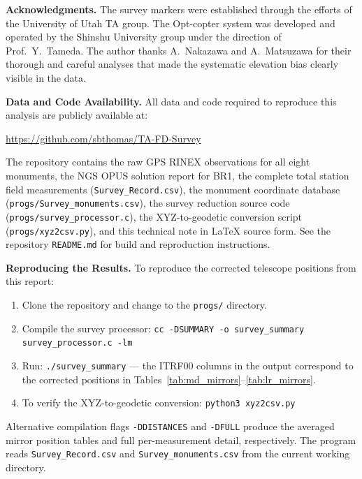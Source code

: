 \documentclass[11pt,letterpaper]{article}
\begin{document}
{\small
\noindent\textbf{Acknowledgments.} The survey markers were established through the efforts of the University of Utah TA group. The Opt-copter system was developed and operated by the Shinshu University group under the direction of Prof.\ Y.\ Tameda. The author thanks A.\ Nakazawa and A.\ Matsuzawa for their thorough and careful analyses that made the systematic elevation bias clearly visible in the data.

\vspace{0.5cm}

\noindent\textbf{Data and Code Availability.} All data and code required to reproduce this analysis are publicly available at:

\begin{center}
\url{https://github.com/sbthomas/TA-FD-Survey}
\end{center}

\noindent The repository contains the raw GPS RINEX observations for all eight monuments, the NGS OPUS solution report for BR1, the complete total station field measurements (\texttt{Survey\_Record.csv}), the monument coordinate database (\texttt{progs/Survey\_monuments.csv}), the survey reduction source code (\texttt{progs/survey\_processor.c}), the XYZ-to-geodetic conversion script (\texttt{progs/xyz2csv.py}), and this technical note in \LaTeX{} source form. See the repository \texttt{README.md} for build and reproduction instructions.

\vspace{0.3cm}

\noindent\textbf{Reproducing the Results.} To reproduce the corrected telescope positions from this report:

\begin{enumerate}[nosep]
\item Clone the repository and change to the \texttt{progs/} directory.
\item Compile the survey processor: \texttt{cc -DSUMMARY -o survey\_summary survey\_processor.c -lm}
\item Run: \texttt{./survey\_summary} --- the ITRF00 columns in the output correspond to the corrected positions in Tables~\ref{tab:md_mirrors}--\ref{tab:lr_mirrors}.
\item To verify the XYZ-to-geodetic conversion: \texttt{python3 xyz2csv.py}
\end{enumerate}

\noindent Alternative compilation flags \texttt{-DDISTANCES} and \texttt{-DFULL} produce the averaged mirror position tables and full per-measurement detail, respectively. The program reads \texttt{Survey\_Record.csv} and \texttt{Survey\_monuments.csv} from the current working directory.

}
\end{document}
